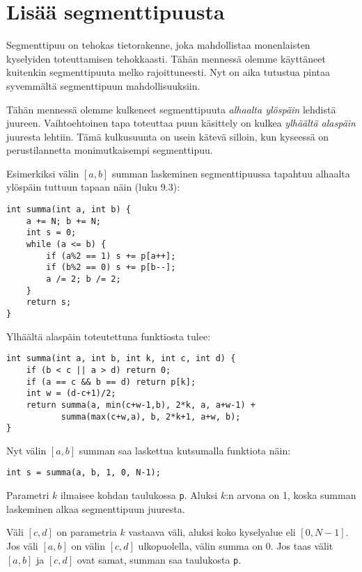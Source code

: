 \chapter{Lisää segmenttipuusta}


Segmenttipuu on tehokas tietorakenne,
joka mahdollistaa monenlaisten
kyselyiden toteuttamisen tehokkaasti.
Tähän mennessä olemme käyttäneet
kuitenkin segmenttipuuta melko rajoittuneesti.
Nyt on aika tutustua pintaa syvemmältä
segmenttipuun mahdollisuuksiin.

Tähän mennessä olemme kulkeneet segmenttipuuta
\textit{alhaalta ylöspäin} lehdistä juureen.
Vaihtoehtoinen tapa toteuttaa puun käsittely
on kulkea \textit{ylhäältä alaspäin} juuresta lehtiin.
Tämä kulkusuunta on usein kätevä silloin,
kun kyseessä on perustilannetta
monimutkaisempi segmenttipuu.

Esimerkiksi välin $[a,b]$ summan laskeminen
segmenttipuussa tapahtuu alhaalta ylöspäin 
tuttuun tapaan näin (luku 9.3):

\begin{lstlisting}
int summa(int a, int b) {
    a += N; b += N;
    int s = 0;
    while (a <= b) {
        if (a%2 == 1) s += p[a++];
        if (b%2 == 0) s += p[b--];
        a /= 2; b /= 2;
    }
    return s;
}
\end{lstlisting}
Ylhäältä alaspäin toteutettuna funktiosta tulee:

\begin{lstlisting}
int summa(int a, int b, int k, int c, int d) {
    if (b < c || a > d) return 0;
    if (a == c && b == d) return p[k];
    int w = (d-c+1)/2;
    return summa(a, min(c+w-1,b), 2*k, a, a+w-1) +
           summa(max(c+w,a), b, 2*k+1, a+w, b);
}
\end{lstlisting}
Nyt välin $[a,b]$ summan saa laskettua
kutsumalla funktiota näin:

\begin{lstlisting}
int s = summa(a, b, 1, 0, N-1);
\end{lstlisting}

Parametri $k$ ilmaisee kohdan
taulukossa \texttt{p}.
Aluksi $k$:n arvona on 1,
koska summan laskeminen alkaa
segmenttipuun juuresta.

Väli $[c,d]$ on parametria $k$ vastaava väli,
aluksi koko kyselyalue eli $[0,N-1]$.
Jos väli $[a,b]$ on välin $[c,d]$
ulkopuolella, välin summa on 0.
Jos taas välit $[a,b]$ ja $[c,d]$
ovat samat, summan saa taulukosta \texttt{p}.

